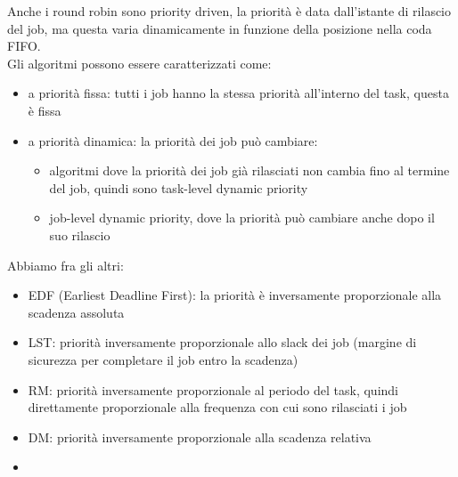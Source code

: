 \documentclass[12pt, oneside]{extbook}
\begin{document}
Anche i round robin sono priority driven, la priorità è data dall'istante di rilascio del job, ma questa varia dinamicamente in funzione della posizione nella coda FIFO.\\
Gli algoritmi possono essere caratterizzati come:
\begin{itemize}
	\item a priorità fissa: tutti i job hanno la stessa priorità all'interno del task, questa è fissa
	\item a priorità dinamica: la priorità dei job può cambiare:
	\begin{itemize}
		\item algoritmi dove la priorità dei job già rilasciati non cambia fino al termine del job, quindi sono task-level dynamic priority
		\item job-level dynamic priority, dove la priorità può cambiare anche dopo il suo rilascio
	\end{itemize}
\end{itemize}
Abbiamo fra gli altri:
\begin{itemize}
	\item EDF (Earliest Deadline First): la priorità è inversamente proporzionale alla scadenza assoluta
	\item LST: priorità inversamente proporzionale allo slack dei job (margine di sicurezza per completare il job entro la scadenza)
	\item RM: priorità inversamente proporzionale al periodo del task, quindi direttamente proporzionale alla frequenza con cui sono rilasciati i job
	\item DM: priorità inversamente proporzionale alla scadenza relativa
	\item 
\end{itemize}
\end{document}
